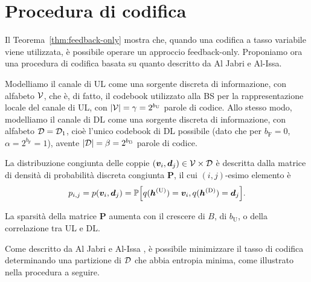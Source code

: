 \section{Procedura di codifica}

Il Teorema~\ref{thm:feedback-only} mostra che, quando una codifica a tasso
variabile viene utilizzata, è possibile operare un approccio feedback-only.
Proponiamo ora una procedura di codifica basata su quanto descritto da Al Jabri
e Al-Issa.\cite{10.1007/BFb0024445}

Modelliamo il canale di UL come una sorgente discreta di informazione, con
alfabeto \(\mathcal{V}\), che è, di fatto, il codebook utilizzato alla BS per la
rappresentazione locale del canale di UL, con \(\abs{\set{V}} = \gamma =
2^{b_\mathrm{U}}\) parole di codice. Allo stesso modo, modelliamo il canale di
DL come una sorgente discreta di informazione, con alfabeto \(\mathcal{D} =
\mathcal{D}_1\), cioè l'unico codebook di DL possibile (dato che per \(b_\mathrm{F}
= 0\), \(\alpha = 2^{b_\mathrm{F}} = 1\)), avente \(\abs{\set{D}} = \beta =
2^{b_\mathrm{B}}\) parole di codice.

La distribuzione congiunta delle coppie \((\bm{v}_i,\bm{d}_j) \in
\mathcal{V} \times \mathcal{D}\) è descritta dalla matrice di densità di probabilità
discreta congiunta \(\bm{P}\), il cui \((i,j)\)-esimo elemento è
\begin{equation}
    p_{i,j} = p(\bm{v}_i, \bm{d}_j) = \prob{
        q(\bm{h}^\mathrm{(U)}) = \bm{v}_i ,
        q(\bm{h}^\mathrm{(D)}) = \bm{d}_j
    } .
\end{equation}

La sparsità della matrice \(\bm{P}\) aumenta con il crescere di \(B\), di
\(b_\mathrm{U}\), o della correlazione tra UL e DL.

Come descritto da Al Jabri e Al-Issa \cite{10.1007/BFb0024445}, è possibile
minimizzare il tasso di codifica determinando una partizione di \(\mathcal{D}\) che
abbia entropia minima, come illustrato nella procedura a seguire.

